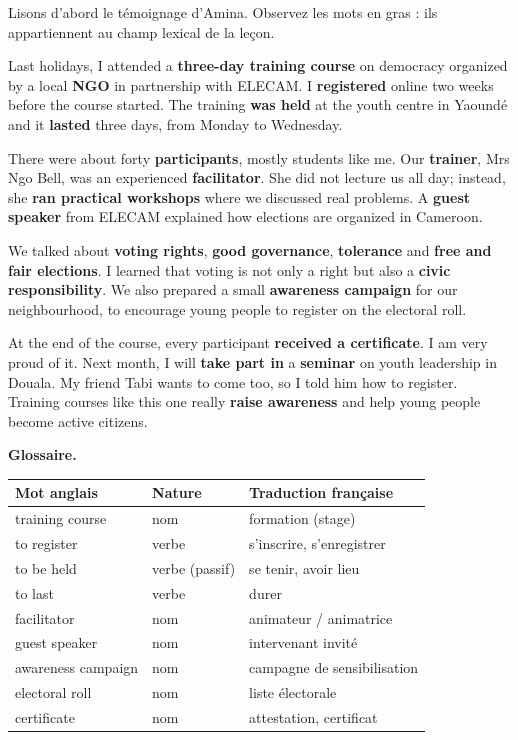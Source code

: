 \documentclass[11pt]{article}
\begin{document}
Lisons d'abord le témoignage d'Amina. Observez les mots en gras : ils appartiennent au champ lexical de la leçon.

\begin{textebox}
Last holidays, I attended a \textbf{three-day training course} on democracy organized by a local \textbf{NGO} in partnership with ELECAM. I \textbf{registered} online two weeks before the course started. The training \textbf{was held} at the youth centre in Yaoundé and it \textbf{lasted} three days, from Monday to Wednesday.

There were about forty \textbf{participants}, mostly students like me. Our \textbf{trainer}, Mrs Ngo Bell, was an experienced \textbf{facilitator}. She did not lecture us all day; instead, she \textbf{ran practical workshops} where we discussed real problems. A \textbf{guest speaker} from ELECAM explained how elections are organized in Cameroon.

We talked about \textbf{voting rights}, \textbf{good governance}, \textbf{tolerance} and \textbf{free and fair elections}. I learned that voting is not only a right but also a \textbf{civic responsibility}. We also prepared a small \textbf{awareness campaign} for our neighbourhood, to encourage young people to register on the electoral roll.

At the end of the course, every participant \textbf{received a certificate}. I am very proud of it. Next month, I will \textbf{take part in} a \textbf{seminar} on youth leadership in Douala. My friend Tabi wants to come too, so I told him how to register. Training courses like this one really \textbf{raise awareness} and help young people become active citizens.
\end{textebox}

\textbf{Glossaire.}
\begin{center}
\begin{tabularx}{\linewidth}{|l|l|X|}
\hline
\rowcolor{popblueL} Mot anglais & Nature & Traduction française \\
\hline
training course & nom & formation (stage) \\
\hline
to register & verbe & s'inscrire, s'enregistrer \\
\hline
to be held & verbe (passif) & se tenir, avoir lieu \\
\hline
to last & verbe & durer \\
\hline
facilitator & nom & animateur / animatrice \\
\hline
guest speaker & nom & intervenant invité \\
\hline
awareness campaign & nom & campagne de sensibilisation \\
\hline
electoral roll & nom & liste électorale \\
\hline
certificate & nom & attestation, certificat \\
\hline
\end{tabularx}
\end{center}
\end{document}
